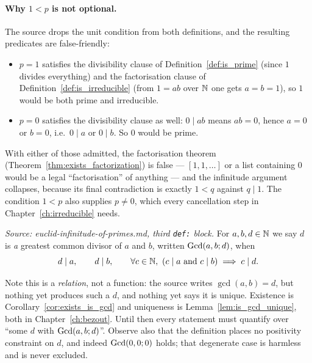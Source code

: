 \paragraph{Why $1 < p$ is not optional.}
The source drops the unit condition from both definitions, and the resulting
predicates are false-friendly:
\begin{itemize}
  \item $p = 1$ satisfies the divisibility clause of
    Definition~\ref{def:is_prime} (since $1$ divides everything) and the
    factorisation clause of Definition~\ref{def:is_irreducible} (from
    $1 = ab$ over $\mathbb{N}$ one gets $a = b = 1$), so $1$ would be both prime and
    irreducible.
  \item $p = 0$ satisfies the divisibility clause as well: $0 \mid ab$ means
    $ab = 0$, hence $a = 0$ or $b = 0$, i.e.\ $0 \mid a$ or $0 \mid b$. So $0$
    would be prime.
\end{itemize}
With either of those admitted, the factorisation theorem
(Theorem~\ref{thm:exists_factorization}) is false --- $[1,1,\dots]$ or a list
containing $0$ would be a legal ``factorisation'' of anything --- and the
infinitude argument collapses, because its final contradiction is exactly
$1 < q$ against $q \mid 1$. The condition $1 < p$ also supplies $p \neq 0$,
which every cancellation step in Chapter~\ref{ch:irreducible} needs.

\begin{definition}
  \leanok
  \label{def:is_gcd}
  \textit{Source: euclid-infinitude-of-primes.md, third \texttt{def:} block.}
  For $a, b, d \in \mathbb{N}$ we say $d$ is \emph{a} greatest common divisor of $a$
  and $b$, written $\mathrm{Gcd}(a,b;d)$, when
  \[
    d \mid a, \qquad d \mid b, \qquad \forall c \in \mathbb{N},\ (c \mid a \ \text{and}\ c \mid b) \implies c \mid d .
  \]
\end{definition}

Note this is a \emph{relation}, not a function: the source writes
$\gcd(a,b) = d$, but nothing yet produces such a $d$, and nothing yet says it is
unique. Existence is Corollary~\ref{cor:exists_is_gcd} and uniqueness is
Lemma~\ref{lem:is_gcd_unique}, both in Chapter~\ref{ch:bezout}. Until then every
statement must quantify over ``some $d$ with $\mathrm{Gcd}(a,b;d)$''. Observe also
that the definition places no positivity constraint on $d$, and indeed
$\mathrm{Gcd}(0,0;0)$ holds; that degenerate case is harmless and is never excluded.

